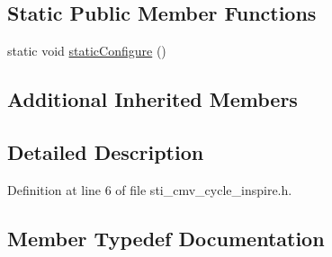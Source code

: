 \subsection*{Static Public Member Functions}
\begin{DoxyCompactItemize}
\item 
static void \hyperlink{structsm__respira__1_1_1cmv__cycle__inner__states_1_1StiPSCycleInspire_a826ed1f5ccad664dcaf482b2c7a59330}{static\+Configure} ()
\end{DoxyCompactItemize}
\subsection*{Additional Inherited Members}


\subsection{Detailed Description}


Definition at line 6 of file sti\+\_\+cmv\+\_\+cycle\+\_\+inspire.\+h.



\subsection{Member Typedef Documentation}
\mbox{\label{structsm__respira__1_1_1cmv__cycle__inner__states_1_1StiPSCycleInspire_a623cee3fa3b09047379a349a8391b204}} 
